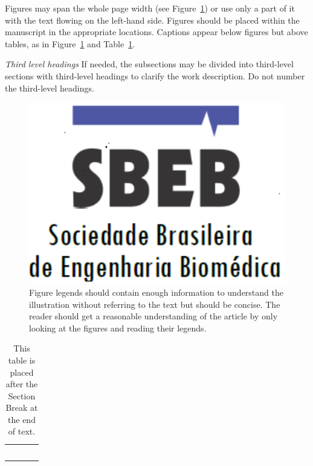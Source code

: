 \documentclass[nouppercase]{ifmbe}
\begin{document}
Figures may span the whole page width (see Figure~\ref{fig:fig1}) or use only a part of it with the text flowing on the left-hand side. Figures should be placed within the manuscript in the appropriate locations. Captions appear below figures but above tables, as in Figure~\ref{fig:fig1} and Table~\ref{tab:tab1}.

\textit{{Third level headings}}
If needed, the subsections may be divided into third-level sections with third-level headings to clarify the work description. Do not number the third-level headings.

\begin{figure}[ht]
      \centering
          \includegraphics[width=1\columnwidth]{figures/logo sbeb.png}
      \caption{Figure legends should contain enough information to understand the illustration without referring to the text but should be concise. The reader should get a reasonable understanding of the article by only looking at the figures and reading their legends.}
      \label{fig:fig1}
\end{figure}

\begin{table}[bt]
\centering
\caption{This table is placed after the Section Break at the end of text.}
\label{tab:tab1}
\begin{tabular}{|p{1.5cm}|p{1.5cm}|p{1.5cm}|p{1.5cm}|}
\hline
 &  &  & \\\hline
 &  &  & \\\hline
 &  &  & \\\hline
 &  &  & \\\hline
 &  &  & \\\hline
 &  &  & \\\hline
\end{tabular}
\end{table}
\end{document}
